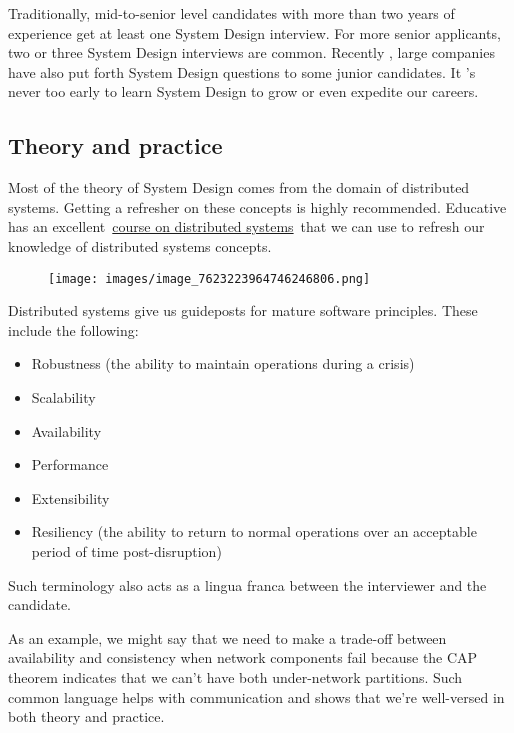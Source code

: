 Traditionally, mid-to-senior level candidates with more than two years of experience get at least one System Design interview. For more senior applicants, two or three System Design interviews are common. Recently , large companies have also put forth System Design questions to some junior candidates. It
's never too early to learn System Design to grow or even expedite our careers.

\subsection{Theory and practice}\label{Theory-and-practice}

Most of the theory of System Design comes from the domain of distributed systems. Getting a refresher on these concepts is highly recommended. Educative has an excellent~\href{https://www.educative.io/courses/distributed-systems-practitioners}{course on distributed systems}~that we can use to refresh our knowledge of distributed systems concepts.

\begin{figure}[htbp]
 \centering
 \texttt{[image: images/image\_7623223964746246806.png]}
 
\end{figure}

Distributed systems give us guideposts for mature software principles. These include the following:

\begin{itemize}
\item
{}\label{8kWi4A5f2dvVaS_hyGAi2}
Robustness (the ability to maintain operations during a crisis)
\item
{}\label{n3X5NCP6M5Okm3RpeZFRy}
Scalability
\item
{}\label{wgHfXTx2euzdgaOwBdrv_}
Availability
\item
{}\label{Ao7XJxlae4646PY6EfSGQ}
Performance
\item
{}\label{UY-ZFRoBhpqHsi-D-u2X5}
Extensibility
\item
{}\label{2T30P2o-IzhDNLgBA_m8P}
Resiliency (the ability to return to normal operations over an acceptable period of time post-disruption)
\end{itemize}

Such terminology also acts as a lingua franca between the interviewer and the candidate.

As an example, we might say that we need to make a trade-off between availability and consistency when network components fail because the CAP theorem indicates that we can't have both under-network partitions. Such common language helps with communication and shows that we're well-versed in both theory and practice.

